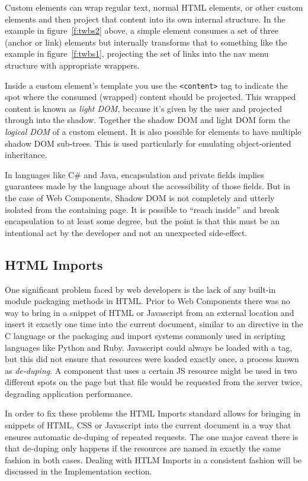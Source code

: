 Custom elements can wrap regular text, normal HTML elements, or other custom elements and then project that content into its own internal structure.
In the example in figure~\ref{f:twbs2} above, a simple  element consumes a set of three  (anchor or link) elements
but internally transforms that to something like the example in figure~\ref{f:twbs1}, 
projecting the set of links into the nav menu structure with appropriate wrappers.

Inside a custom element's template you use the \verb|<content>| tag to indicate the spot where the consumed (wrapped) content should be projected. 
This wrapped content is known as \textit{light DOM}, because it's given by the user and projected through into the shadow.
Together the shadow DOM and light DOM form the \textit{logical DOM} of a custom element.
It is also possible for elements to have multiple shadow DOM sub-trees. 
This is used particularly for emulating object-oriented inheritance.

In languages like C\# and Java, encapsulation and private fields implies guarantees made by the language about the accessibility of those fields.
But in the case of Web Components, Shadow DOM is not completely and utterly isolated from the containing page.
It is possible to ``reach inside'' and break encapsulation to at least some degree, 
but the point is that this must be an intentional act by the developer and not an unexpected side-effect.

\subsection{HTML Imports}
One significant problem faced by web developers is the lack of any built-in module packaging methods in HTML.
Prior to Web Components there was no way to bring in a snippet of HTML or Javascript from an external location and insert it exactly one time into the current document, similar to an  directive in the C language or the packaging and import systems commonly used in scripting languages like Python and Ruby. 
Javascript could always be loaded with a  tag, but this did not ensure that resources were loaded exactly once, a process known as \textit{de-duping}.
A component that uses a certain JS resource might be used in two different spots on the page but that file would be requested from the server twice, degrading application performance.

In order to fix these problems the HTML Imports standard allows for bringing in snippets of HTML, CSS or Javascript into the current document in a way that ensures automatic de-duping of repeated requests.
The one major caveat there is that de-duping only happens if the resources are named in exactly the same fashion in both cases.
Dealing with HTLM Imports in a consistent fashion will be discussed in the Implementation section.

